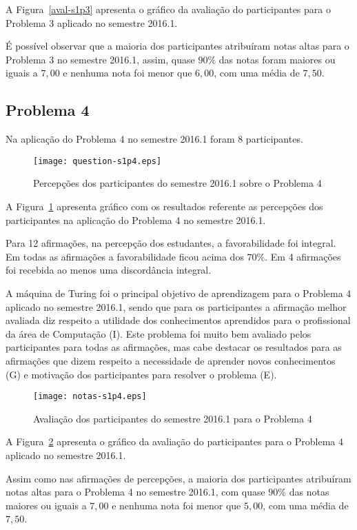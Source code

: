 A Figura~\ref{aval-s1p3} apresenta o gráfico da
avaliação do participantes para o Problema 3 aplicado no semestre 2016.1.

É possível observar que a maioria dos participantes atribuíram
notas altas para o Problema 3 no semestre 2016.1, assim, quase $90\%$ das notas
foram maiores ou iguais a $7,00$ e nenhuma nota foi menor que $6,00$, com uma média
de $7,50$.

\subsection{Problema 4}
Na aplicação do Problema 4 no semestre 2016.1 foram 8 participantes.

\begin{figure}[!htb]
\centering
\texttt{[image: question-s1p4.eps]}
\caption{Percepções dos participantes do semestre 2016.1 sobre o Problema 4}
\label{percep-s1p4}
\end{figure}

A Figura~\ref{percep-s1p4} apresenta gráfico com os resultados referente
as percepções dos participantes na aplicação do
Problema 4 no semestre 2016.1.

Para 12 afirmações, na percepção dos estudantes, a favorabilidade foi integral.
Em todas as afirmações a favorabilidade ficou acima dos $70\%$.
Em 4 afirmações foi recebida ao menos uma discordância integral.

A máquina de Turing foi o principal objetivo de aprendizagem para o Problema 4
aplicado no semestre 2016.1, sendo que para os participantes a afirmação
melhor avaliada diz respeito a utilidade dos conhecimentos aprendidos para 
o profissional da área de Computação (I).
Este problema foi muito bem avaliado pelos participantes para todas
as afirmações, mas cabe destacar os resultados para as afirmações que
dizem respeito a necessidade de aprender novos conhecimentos (G) e
motivação dos participantes para resolver o problema (E).

\begin{figure}[!htb]
\centering
\texttt{[image: notas-s1p4.eps]}
\caption{Avaliação dos participantes do semestre 2016.1 para o Problema 4}
\label{aval-s1p4}
\end{figure}

A Figura~\ref{aval-s1p4} apresenta o gráfico da
avaliação do participantes para o Problema 4 aplicado no semestre 2016.1.


Assim como nas afirmações de percepções, a maioria dos participantes
atribuíram notas altas para o Problema 4 no semestre 2016.1,
com quase $90\%$ das notas maiores ou iguais a $7,00$ e nenhuma nota
foi menor que $5,00$, com uma média de $7,50$.

